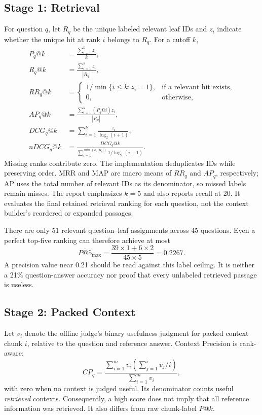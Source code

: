 \documentclass[11pt,a4paper,oneside]{report}
\begin{document}
\subsection{Stage 1: Retrieval}
For question $q$, let $R_q$ be the unique labeled relevant leaf IDs and $z_i$ indicate whether the unique hit at rank $i$ belongs to $R_q$. For a cutoff $k$,
\begin{align}
P_q@k&=\frac{\sum_{i=1}^{k}z_i}{k},\\
R_q@k&=\frac{\sum_{i=1}^{k}z_i}{|R_q|},\\
RR_q@k&=\begin{cases}1/\min\{i\leq k:z_i=1\},&\text{if a relevant hit exists},\\0,&\text{otherwise},\end{cases}\\
AP_q@k&=\frac{\sum_{i=1}^{k}(P_q@i)z_i}{|R_q|},\\
DCG_q@k&=\sum_{i=1}^{k}\frac{z_i}{\log_2(i+1)},\\
nDCG_q@k&=\frac{DCG_q@k}{\sum_{i=1}^{\min(k,|R_q|)}1/\log_2(i+1)}.
\end{align}
Missing ranks contribute zero. The implementation deduplicates IDs while preserving order. MRR and MAP are macro means of $RR_q$ and $AP_q$, respectively; AP uses the total number of relevant IDs as its denominator, so missed labels remain misses. The report emphasizes $k=5$ and also reports recall at 20. It evaluates the final retained retrieval ranking for each question, not the context builder's reordered or expanded passages.

There are only 51 relevant question--leaf assignments across 45 questions. Even a perfect top-five ranking can therefore achieve at most
\begin{equation}
\overline{P@5}_{\max}=\frac{39\times1+6\times2}{45\times5}=0.2267.
\end{equation}
A precision value near 0.21 should be read against this label ceiling. It is neither a 21\% question-answer accuracy nor proof that every unlabeled retrieved passage is useless.

\subsection{Stage 2: Packed Context}
Let $v_i$ denote the offline judge's binary usefulness judgment for packed context chunk $i$, relative to the question and reference answer. Context Precision is rank-aware:
\begin{equation}
CP_q=\frac{\sum_{i=1}^{m}v_i\left(\sum_{j=1}^{i}v_j/i\right)}{\sum_{i=1}^{m}v_i},
\end{equation}
with zero when no context is judged useful. Its denominator counts useful \emph{retrieved} contexts. Consequently, a high score does not imply that all reference information was retrieved. It also differs from raw chunk-label $P@k$.
\end{document}
